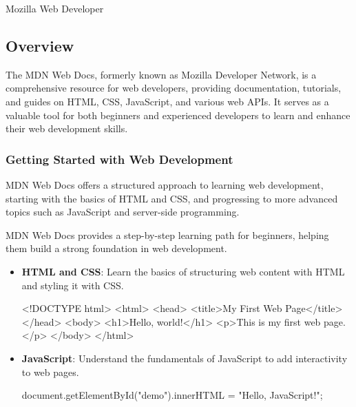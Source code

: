 \begin{notes}{Mozilla Web Developer}
    \subsection*{Overview}

    The MDN Web Docs, formerly known as Mozilla Developer Network, is a comprehensive resource for web developers, providing documentation, tutorials, and guides on HTML, CSS, JavaScript, and various 
    web APIs. It serves as a valuable tool for both beginners and experienced developers to learn and enhance their web development skills.
    
    \subsubsection*{Getting Started with Web Development}
    
    MDN Web Docs offers a structured approach to learning web development, starting with the basics of HTML and CSS, and progressing to more advanced topics such as JavaScript and server-side programming.
    
    \begin{highlight}
    
        MDN Web Docs provides a step-by-step learning path for beginners, helping them build a strong foundation in web development.
        
        \begin{itemize}
            \item \textbf{HTML and CSS}: Learn the basics of structuring web content with HTML and styling it with CSS.
    \begin{code}[HTML]
    <!DOCTYPE html>
    <html>
        <head>
            <title>My First Web Page</title>
        </head>
        <body>
            <h1>Hello, world!</h1>
            <p>This is my first web page.</p>
        </body>
    </html>
    \end{code}
            \item \textbf{JavaScript}: Understand the fundamentals of JavaScript to add interactivity to web pages.
    \begin{code}[JavaScript]
    document.getElementById("demo").innerHTML = "Hello, JavaScript!";
    \end{code}
        \end{itemize}
    
    \end{highlight}
    

\end{notes}
